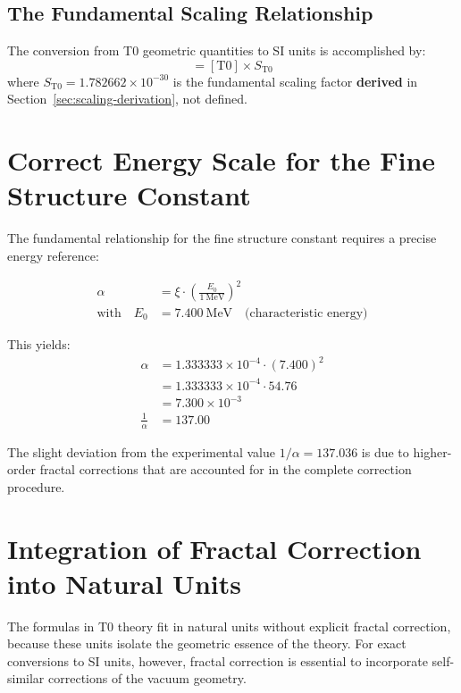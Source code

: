 	\subsection{The Fundamental Scaling Relationship}
	The conversion from T0 geometric quantities to SI units is accomplished by:
	\begin{equation}
		[\mathrm{SI}] = [\mathrm{T0}] \times S_{\text{T0}}
	\end{equation}
	where $S_{\text{T0}} = 1.782662 \times 10^{-30}$ is the fundamental scaling factor \textbf{derived} in Section~\ref{sec:scaling-derivation}, not defined.
	
	\section{Correct Energy Scale for the Fine Structure Constant}
	
	The fundamental relationship for the fine structure constant requires a precise energy reference:
	
	\begin{align}
		\alpha &= \xi \cdot \left( \frac{E_0}{1~\mathrm{MeV}} \right)^2 \\
		\text{with} \quad E_0 &= 7.400~\mathrm{MeV} \quad \text{(characteristic energy)}
	\end{align}
	
	This yields:
	\begin{align}
		\alpha &= 1.333333 \times 10^{-4} \cdot (7.400)^2 \\
		&= 1.333333 \times 10^{-4} \cdot 54.76 \\
		&= 7.300 \times 10^{-3} \\
		\frac{1}{\alpha} &= 137.00
	\end{align}
	
	The slight deviation from the experimental value $1/\alpha = 137.036$ is due to higher-order fractal corrections that are accounted for in the complete correction procedure.
	
	\section{Integration of Fractal Correction into Natural Units}
	
	The formulas in T0 theory fit in natural units without explicit fractal correction, because these units isolate the geometric essence of the theory. For exact conversions to SI units, however, fractal correction is essential to incorporate self-similar corrections of the vacuum geometry.
	
